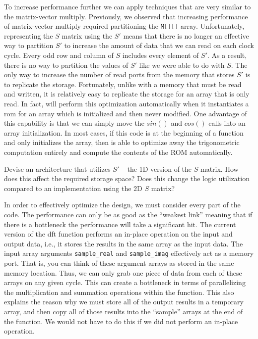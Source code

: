 To increase performance further we can apply techniques that are very similar to the matrix-vector multiply.  Previously, we observed that increasing performance of matrix-vector multiply required partitioning the \lstinline|M[][]| array.  Unfortunately, representing the $S$ matrix using the $S'$ means that there is no longer an effective way to partition $S'$ to increase the amount of data that we can read on each clock cycle. Every odd row and column of $S$ includes every element of $S'$.  As a result, there is no way to partition the values of $S'$ like we were able to do with $S$.  The only way to increase the number of read ports from the memory that stores $S'$ is to replicate the storage.  Fortunately, unlike with a memory that must be read and written, it is relatively easy to replicate the storage for an array that is only read.  In fact, \VHLS will perform this optimization automatically when it instantiates a \gls{rom} for an array which is initialized and then never modified.  One advantage of this capability is that we can simply move the $sin()$ and $cos()$ calls into an array initialization.  In most cases, if this code is at the beginning of a function and only initializes the array, then \VHLS is able to optimize away the trigonometric computation entirely and compute the contents of the ROM automatically.

\begin{exercise}
Devise an architecture that utilizes $S'$ -- the 1D version of the $S$ matrix. How does this affect the required storage space? Does this change the logic utilization compared to an implementation using the 2D $S$ matrix? 
\end{exercise}

In order to effectively optimize the design, we must consider every part of the code. The performance can only be as good as the ``weakest link'' meaning that if there is a bottleneck the performance will take a significant hit. The current version of the \gls{dft} function performs an in-place operation on the input and output data, i.e., it stores the results in the same array as the input data. The input array arguments \lstinline|sample_real| and \lstinline|sample_imag| effectively act as a memory port. That is, you can think of these argument arrays as stored in the same memory location. Thus, we can only grab one piece of data from each of these arrays on any given cycle. This can create a bottleneck in terms of parallelizing the multiplication and summation operations within the function. This also explains the reason why we must store all of the output results in a temporary array, and then copy all of those results into the ``sample'' arrays at the end of the function. We would not have to do this if we did not perform an in-place operation. 

